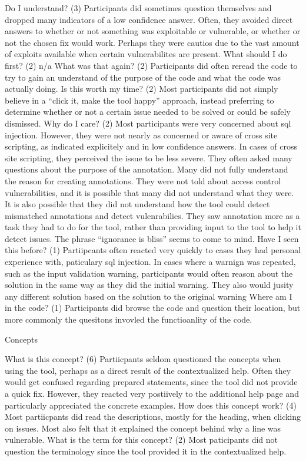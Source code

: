 \documentclass[twoside,letterpaper]{soups}
\begin{document}
Do I understand? (3) Participants did sometimes question themselves and dropped many indicators of a low confidence answer. Often, they avoided direct answers to whether or not something was exploitable or vulnerable, or whether or not the chosen fix would work. Perhaps they were cautios due to the vast amount of exploits available when certain vulnerabilites are present. 
What should I do first? (2) n/a
What was that again? (2) Participants did often reread the code to try to gain an understand of the purpose of the code and what the code was actually doing.
Is this worth my time? (2) Most participants did not simply believe in a “click it, make the tool happy” approach, instead preferring to determine whether or not a certain issue needed to be solved or could be  safely dismissed.
Why do I care? (2) Most participants were very concerned about sql injection. However, they were not nearly as concerned or aware of cross site scripting, as indicated explicitely and in low confidence answers. In cases of cross site scripting, they perceived the issue to be less severe. They often asked many questions about the purpose of the annotation. Many did not fully understand the reason for creating annotations. They were not told about access control vulnerabilities, and it is possible that many did not understand what they were. It is also possible that they did not understand how the tool could detect mismatched annotations and detect vulenrabilies. They saw annotation more as a task they had to do for the tool, rather than providing input to the tool to help it detect issues. The phrase 
“ignorance is bliss” seems to come to mind.
Have I seen this before? (1) Partiipcants often reacted very quickly to cases they had personal experience with, paticulary sql injection. In cases where a warnign was repeated, such as the input validation warning, participants would often reason about the solution in the same way as they did the initial warning. They also would jusity any different solution based on the solution to the original warning
Where am I in the code? (1) Participants did browse the code and question their location, but more commonly the quesitons invovled the functioanlity of the code.

Concepts

What is this concept? (6) Partiicpants seldom questioned the concepts when using the tool, perhaps as a direct result of the contextualized help. Often they would get confused regarding prepared statements, since the tool did not provide a quick fix. However, they reacted very postiively to the additional help page and particularly appreciated the concrete examples.
How does this concept work? (4) Most partiicpants did read the descriptions, mostly for the heading, when clicking on issues. Most also felt that it explained the concept behind why a line was vulnerable. 
What is the term for this concept? (2) Most paticipants did not question the terminology since the tool provided it in the contextualized help.
\end{document}
